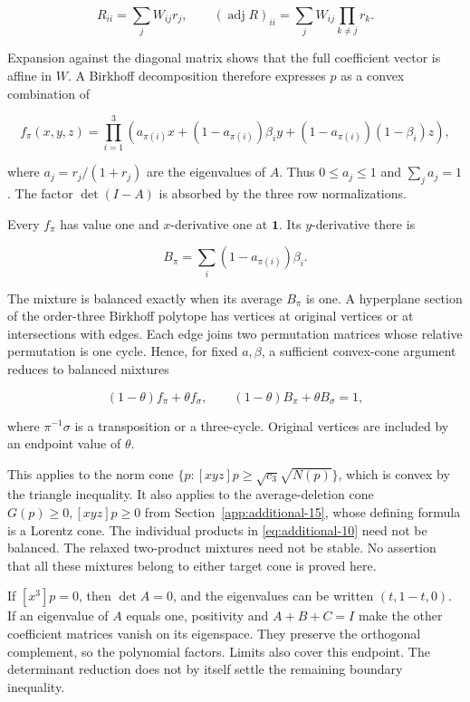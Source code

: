 \[
R_{ii}=\sum_jW_{ij}r_j,\qquad
(\operatorname{adj}R)_{ii}=\sum_jW_{ij}\prod_{k\ne j}r_k.
\]

Expansion against the diagonal matrix shows that the full coefficient vector is affine in \(W\). A Birkhoff decomposition therefore expresses \(p\) as a convex combination of

\begin{equation}
f_\pi(x,y,z)=\prod_{i=1}^3
\left(a_{\pi(i)}x+(1-a_{\pi(i)})\beta_i y
+(1-a_{\pi(i)})(1-\beta_i)z\right),
\label{eq:additional-10}
\end{equation}

where \(a_j=r_j/(1+r_j)\) are the eigenvalues of \(A\). Thus \(0\le a_j\le1\) and \(\sum_j a_j=1\). The factor \(\det(I-A)\) is absorbed by the three row normalizations.

Every \(f_\pi\) has value one and \(x\)-derivative one at \(\mathbf1\). Its \(y\)-derivative there is

\[
B_\pi=\sum_i(1-a_{\pi(i)})\beta_i.
\]

The mixture is balanced exactly when its average \(B_\pi\) is one. A hyperplane section of the order-three Birkhoff polytope has vertices at original vertices or at intersections with edges. Each edge joins two permutation matrices whose relative permutation is one cycle. Hence, for fixed \(a,\beta\), a sufficient convex-cone argument reduces to balanced mixtures

\[
(1-\theta)f_\pi+\theta f_\sigma,\qquad
(1-\theta)B_\pi+\theta B_\sigma=1,
\]

where \(\pi^{-1}\sigma\) is a transposition or a three-cycle. Original vertices are included by an endpoint value of \(\theta\).

This applies to the norm cone \(\{p:[xyz]p\ge\sqrt{c_3}\sqrt{N(p)}\}\), which is convex by the triangle inequality. It also applies to the average-deletion cone \(G(p)\ge0,[xyz]p\ge0\) from Section~\ref{app:additional-15}, whose defining formula is a Lorentz cone. The individual products in \eqref{eq:additional-10} need not be balanced. The relaxed two-product mixtures need not be stable. No assertion that all these mixtures belong to either target cone is proved here.

If \([x^3]p=0\), then \(\det A=0\), and the eigenvalues can be written \((t,1-t,0)\). If an eigenvalue of \(A\) equals one, positivity and \(A+B+C=I\) make the other coefficient matrices vanish on its eigenspace. They preserve the orthogonal complement, so the polynomial factors. Limits also cover this endpoint. The determinant reduction does not by itself settle the remaining boundary inequality.


